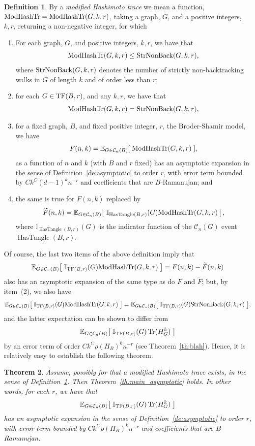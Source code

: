 \documentclass{memo-l}
\newcommand{\TF}{{\rm TF}}
\newcommand{\MT}{{\rm ModHashTr}}
\newcommand{\SNB}{{\rm StrNonBack}}
\theoremstyle{plain}
\newtheorem{theorem}{Theorem}[section]
\theoremstyle{definition}
\newtheorem{definition}[theorem]{Definition}
\numberwithin{section}{chapter}
\numberwithin{equation}{chapter}
\newcommand{\expect}[2]{{\mathbb{E}}_{#1}{\left[\; #2\; \right]}}
\DeclareMathOperator{\HasTangle}{HasTangle}
\DeclareMathOperator{\Tr}{Tr}
\theoremstyle{plain}
\theoremstyle{definition}
\newcommand\II{\mathbb{I}}
\newcommand\cC{\mathcal{C}}
\begin{document}
{\begin{definition}
\label{de:modified_Hashimoto_trace}
By a {\em modified Hashimoto trace} we mean a function,
$\MT=\MT(G,k,r)$, taking a graph, $G$, and a positive integers, $k,r$, 
returning
a non-negative integer, for which
\begin{enumerate}
\item For each graph, $G$, and positive integers, $k,r$, we have
that 
$$
\MT(G,k,r) \le \SNB(G,k,r),
$$
where $\SNB(G,k,r)$ denotes the number of strictly non-backtracking walks
in $G$ of length $k$ and of order less than $r$;
\item for each $G\in\TF(B,r)$, and any $k,r$, we have that
$$
\MT(G,k,r) = \SNB(G,k,r),
$$
\item for a fixed graph, $B$, and fixed positive integer, $r$,
the Broder-Shamir model, we have
$$
F(n,k)=\expect{G\in\cC_n(B)}{\MT(G,k,r)},
$$
as a function of $n$ and $k$ (with $B$ and $r$ fixed)
has an asymptotic expansion in the sense
of Definition~\ref{de:asymptotic}
to order $r$, with error term bounded by
$Ck^C(d-1)^kn^{-r}$ and coefficients that are $B$-Ramanujan; and
\item
the same is true for $F(n,k)$ replaced by
$$
\widetilde F(n,k) =
\expect{G\in\cC_n(B)}{\II_{\HasTangle(B,r)}(G) \MT(G,k,r)} ,
$$
where $\II_{\HasTangle(B,r)}(G)$ is the indicator function of the
$\cC_n(G)$ event $\HasTangle(B,r)$.
\end{enumerate}
\end{definition}
Of course, the last two items of the above definition imply that
$$
\expect{G\in\cC_n(B)}{\II_{\TF(B,r)}(G) \MT(G,k,r)} = F(n,k)-
\widetilde F(n,k)
$$
also has an asymptotic expansion of the same type as do $F$ and 
$\widetilde F$; but, by item~(2), we also have
$$
\expect{G\in\cC_n(B)}{\II_{\TF(B,r)}(G) \MT(G,k,r)} 
=
\expect{G\in\cC_n(B)}{\II_{\TF(B,r)}(G) \SNB(G,k,r)} ,
$$
and the latter expectation can be shown to differ from
$$
\expect{G\in\cC_n(B)}{\II_{\TF(B,r)}(G) \Tr(H_G^k) }
$$
by an error term of order $Ck^C \rho(H_B)^k n^{-r}$
(see Theorem~\ref{th:blah}).
Hence, it is relatively easy to establish the following theorem.

\begin{theorem}\label{th:modified_Hashimoto_trace}
Assume, possibly for that a modified Hashimoto trace exists, in the sense of
Definition~\ref{de:modified_Hashimoto_trace}.  
Then Theorem~\ref{th:main_asymptotic} holds.
In other words, for each $r$, we have that
\begin{equation}\label{eq:tangle_free_trace}
\expect{G\in\cC_n(B)}{\II_{\TF(B,r)}(G) \Tr(H_G^k) }
\end{equation}
has an asymptotic expansion in the sense
of Definition~\ref{de:asymptotic}
to order $r$, with error term bounded by
$Ck^C\rho(H_B)^kn^{-r}$ and coefficients that are $B$-Ramanujan.
\end{theorem}

}
\end{document}
